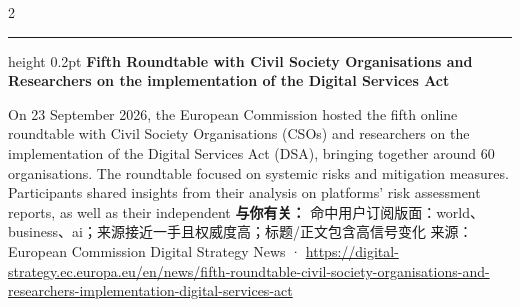 \documentclass[10.5pt]{ctexart}
\begin{document}
\begin{multicols}{2}
\vspace{2mm}
\hrule height 0.2pt
\vspace{2mm}
{\large\bfseries Fifth Roundtable with Civil Society Organisations and Researchers on the implementation of the Digital Services Act}\par
On 23 September 2026, the European Commission hosted the fifth online roundtable with Civil Society Organisations (CSOs) and researchers on the implementation of the Digital Services Act (DSA), bringing together around 60 organisations. The roundtable focused on systemic risks and mitigation measures. Participants shared insights from their analysis on platforms’ risk assessment reports, as well as their independent 
\textbf{与你有关：} 命中用户订阅版面：world、business、ai；来源接近一手且权威度高；标题/正文包含高信号变化
{\footnotesize\color{ormuted} 来源：European Commission Digital Strategy News · \url{https://digital-strategy.ec.europa.eu/en/news/fifth-roundtable-civil-society-organisations-and-researchers-implementation-digital-services-act}}
\end{multicols}
\end{document}
